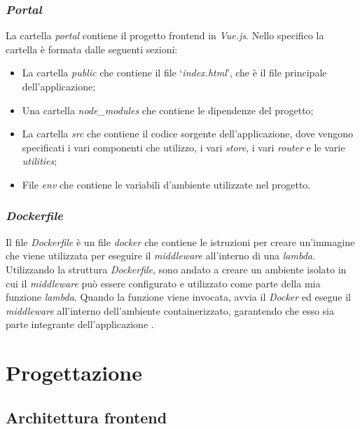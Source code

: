 \subsubsection*{\emph{Portal}}
La cartella \textit{portal} contiene il progetto frontend in \textit{Vue.js}. Nello specifico la cartella è formata dalle seguenti sezioni:
\begin{itemize}
  \item La cartella \textit{public} che contiene il file `\textit{index.html}', che è il file principale dell'applicazione;
  \item Una cartella \textit{node\_modules} che contiene le dipendenze del progetto;
  \item La cartella \textit{src} che contiene il codice sorgente dell'applicazione, dove vengono specificati i vari componenti che utilizzo, i vari \textit{store}, i vari \textit{router} e le varie \textit{utilities};
  \item File \textit{env} che contiene le variabili d'ambiente utilizzate nel progetto.
\end{itemize}

\subsubsection*{\emph{Dockerfile}}
Il file \textit{Dockerfile} è un file \textit{docker} che contiene le istruzioni per creare un'immagine che viene utilizzata per eseguire il \textit{middleware} all'interno di una \textit{lambda}.\\
Utilizzando la struttura \textit{Dockerfile}, sono andato a creare un ambiente isolato in cui il \textit{middleware} può essere configurato e utilizzato come parte della mia funzione 
\textit{lambda}. Quando la funzione viene invocata, avvia il \textit{Docker}  ed esegue il \textit{middleware} all'interno dell'ambiente containerizzato, 
garantendo che esso sia parte integrante dell'applicazione .

\section{Progettazione}\label{sec:progettazione}

\subsection{Architettura frontend}\label{subsec:architettura-front-end}
